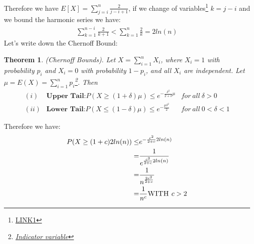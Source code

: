 \documentclass[a4paper]{article}
\newtheorem{theorem}{Theorem}
\begin{document}
Therefore we have $E[X]= \sum_{j=i}^n \frac{2}{j-i+1}$, if we change of variables\footnote{\href{http://math.stackexchange.com/questions/342061/double-summation-index-change-clarification}{LINK1}} $k= j-i$ and we bound the harmonic series we have:
\begin{align*}
\sum_{k=1}^{n-i} \frac{2}{k+1} < \sum_{k=1}^{n} \frac{2}{k}= 2 ln(n)
\end{align*}
Let's write down the Chernoff Bound:
\begin{theorem}
(Chernoff Bounds). Let $X=\sum_{i=1}^n X_{i}$, where $X_i = 1$ with probability $p_i$ and $X_i = 0$ with probability $1 − p_i$, and all $X_i$ are independent. Let $\mu = E(X) = \sum_{i=1}^n p_i$\footnote{\href{http://heather.cs.ucdavis.edu/~matloff/132/GenderExample.pdf}{Indicator variable}}. Then
\begin{align*}
(i) &\textbf{Upper Tail:} P(X \geq (1 + \delta)\mu) \leq e^{-\frac{\delta^2}{2+\delta}\mu} &for \ all \ \delta > 0 \\
(ii) &\textbf{Lower Tail:} P(X \leq (1 - \delta)\mu) \leq e^{-\frac{\mu\delta^2}{2}}      &for \ all \ 0< \delta < 1 
\end{align*}
\end{theorem}
Therefore we have: 
\begin{align*}
P(X \geq (1 + c)2ln(n))\leq & e^{-\frac{c^2}{2+c}2ln(n)} \\
						=   & \frac{1}{e^{\frac{c^2}{2+c}2ln(n)}}\\
						=   & \frac{1}{n^{\frac{2c^2}{2+c}}}\\
						=   & \frac{1}{n^{c}} \textsc{WITH }c>2 \\
\end{align*}
\end{document}
